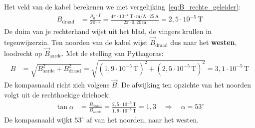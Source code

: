 \documentclass{ximera}
\begin{document}
\begin{example}[foldable=true,title={Kompas naast een verticale stroomkabel}]
\begin{solution}
        Het veld van de kabel berekenen we met vergelijking~\eqref{eq:B_rechte_geleider}:
        \begin{align*}
            B_{\text{draad}} &= \frac{\mu_0 \cdot I}{2\pi \cdot r} = \frac{4\pi \cdot 10^{-7}\,\mathrm{T\cdot m/A} \cdot 25\,\mathrm{A}}{2\pi \cdot 0{,}20\,\mathrm{m}} = 2{,}5 \cdot 10^{-5}\,\mathrm{T}
        \end{align*}
        De duim van je rechterhand wijst uit het blad, de vingers krullen in tegenwijzerzin. Ten noorden van de kabel wijst $\vec{B}_{\text{draad}}$ dus naar het \textbf{westen}, loodrecht op $\vec{B}_{\text{aarde}}$. Met de stelling van Pythagoras:
        \begin{align*}
            B &= \sqrt{B_{\text{aarde}}^2 + B_{\text{draad}}^2} = \sqrt{(1{,}9 \cdot 10^{-5}\,\mathrm{T})^2 + (2{,}5 \cdot 10^{-5}\,\mathrm{T})^2} = \boxed{3{,}1 \cdot 10^{-5}\,\mathrm{T}}
        \end{align*}
        De kompasnaald richt zich volgens $\vec{B}$. De afwijking ten opzichte van het noorden volgt uit de rechthoekige driehoek:
        \begin{align*}
            \tan \alpha &= \frac{B_{\text{draad}}}{B_{\text{aarde}}} = \frac{2{,}5 \cdot 10^{-5}\,\mathrm{T}}{1{,}9 \cdot 10^{-5}\,\mathrm{T}} = 1{,}3 \quad \Rightarrow \quad \boxed{\alpha = 53^\circ}
        \end{align*}
        De kompasnaald wijkt $53^\circ$ af van het noorden, naar het westen.
    \end{solution}
\end{example}
\end{document}
